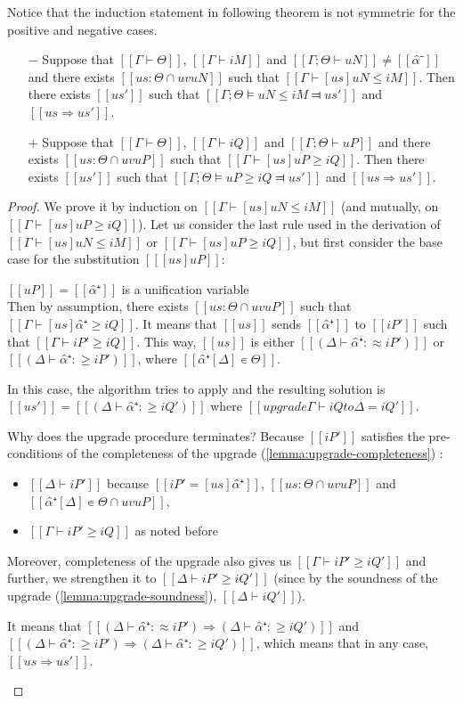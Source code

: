 Notice that the induction statement in following theorem is not symmetric for the positive and negative cases.
\begin{theorem}
    \hfill
    \begin{itemize}
        \item [$-$] Suppose that $[[Γ ⊢ Θ]]$, $[[Γ ⊢ iM]]$ and $[[Γ ; Θ ⊢ uN]] \neq [[α̂⁻]]$ and there exists $[[us : Θ ∩ uv uN]]$ such that $[[ Γ ⊢ [us]uN ≤ iM ]]$.
        Then there exists $[[us']]$ such that $[[Γ ; Θ ⊨ uN ≤ iM ⫤ us']]$
        and $[[us ⇒ us']]$.
        
        \item [$+$] Suppose that $[[Γ ⊢ Θ]]$, $[[Γ ⊢ iQ]]$ and $[[Γ ; Θ ⊢ uP]]$ and
        there exists $[[us : Θ ∩ uv uP]]$ such that $[[ Γ ⊢ [us]uP ≥ iQ ]]$.
        Then there exists $[[us']]$ such that $[[Γ ; Θ ⊨ uP ≥ iQ ⫤ us']]$
        and $[[us ⇒ us']]$.
    \end{itemize}
\end{theorem}
\begin{proof}
    We prove it by induction on $[[ Γ ⊢ [us]uN ≤ iM ]]$ (and mutually, on $[[ Γ ⊢ [us]uP ≥ iQ ]]$).
    Let us consider the last rule used in the derivation of $[[ Γ ⊢ [us]uN ≤ iM ]]$ or $[[ Γ ⊢ [us]uP ≥ iQ ]]$,
    but first consider the base case for the substitution $[[ [us]uP ]]$:
    \begin{caseof}
        \item $[[uP]] = [[ α̂⁺ ]]$ is a unification variable\\
        Then by assumption, there exists $[[us : Θ ∩ uv uP]]$ such that $[[ Γ ⊢ [us]α̂⁺ ≥ iQ ]]$.
        It means that $[[us]]$ sends $[[α̂⁺]]$ to $[[iP']]$ such that $[[Γ ⊢ iP' ≥ iQ]]$.
        This way, $[[us]]$ is either $[[ (Δ ⊢ α̂⁺ :≈ iP') ]]$ or $[[ (Δ ⊢ α̂⁺ :≥ iP') ]]$,
        where $[[α̂⁺[Δ] ∊ Θ]]$.

        In this case, the algorithm tries to apply 
        and the resulting solution is $[[us']] = [[(Δ ⊢ α̂⁺ :≥ iQ')]]$ where
        $[[upgrade Γ ⊢ iQ to Δ = iQ']]$.

        Why does the upgrade procedure terminates?
        Because $[[iP']]$ satisfies the pre-conditions of the completeness of the upgrade
        (\cref{lemma:upgrade-completeness})
        :
        \begin{itemize}
            \item $[[Δ ⊢ iP']]$ because $[[iP' = [us]α̂⁺]]$, $[[us : Θ ∩ uv uP]]$ and 
            $[[α̂⁺[Δ] ∊ Θ ∩ uv uP]]$,
            \item $[[Γ ⊢ iP' ≥ iQ]]$ as noted before
        \end{itemize}
        Moreover, completeness of the upgrade also gives us $[[Γ ⊢ iP' ≥ iQ']]$
        and further, we strengthen it to $[[Δ ⊢ iP' ≥ iQ']]$
        (since by the soundness of the upgrade (\cref{lemma:upgrade-soundness}),
        $[[Δ ⊢ iQ']]$).

        It means that $[[ (Δ ⊢ α̂⁺ :≈ iP') ⇒ (Δ ⊢ α̂⁺ :≥ iQ') ]]$ and 
        $[[ (Δ ⊢ α̂⁺ :≥ iP') ⇒ (Δ ⊢ α̂⁺ :≥ iQ') ]]$, which means that in any case, 
        $[[us ⇒ us']]$.
    \end{caseof}
\end{proof}


